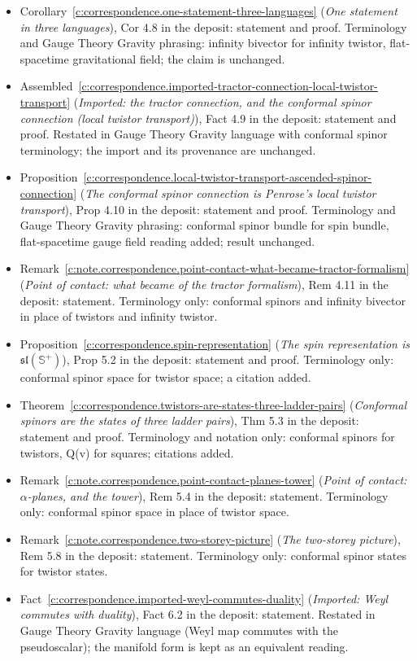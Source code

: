 \documentclass[11pt]{article}
\theoremstyle{definition}
\theoremstyle{plain}
\providecommand{\CS}{}\renewcommand{\CS}{{\mathbb{S}^{+}}}
\begin{document}
\begin{itemize}
\item Corollary~\ref{c:correspondence.one-statement-three-languages} (\emph{One statement in three languages}), Cor 4.8 in the deposit: statement and proof. Terminology and Gauge Theory Gravity phrasing: infinity bivector for infinity twistor, flat-spacetime gravitational field; the claim is unchanged.
\item Assembled~\ref{c:correspondence.imported-tractor-connection-local-twistor-transport} (\emph{Imported: the tractor connection, and the conformal spinor connection (local twistor transport)}), Fact 4.9 in the deposit: statement and proof. Restated in Gauge Theory Gravity language with conformal spinor terminology; the import and its provenance are unchanged.
\item Proposition~\ref{c:correspondence.local-twistor-transport-ascended-spinor-connection} (\emph{The conformal spinor connection is Penrose's local twistor transport}), Prop 4.10 in the deposit: statement and proof. Terminology and Gauge Theory Gravity phrasing: conformal spinor bundle for spin bundle, flat-spacetime gauge field reading added; result unchanged.
\item Remark~\ref{c:note.correspondence.point-contact-what-became-tractor-formalism} (\emph{Point of contact: what became of the tractor formalism}), Rem 4.11 in the deposit: statement. Terminology only: conformal spinors and infinity bivector in place of twistors and infinity twistor.
\item Proposition~\ref{c:correspondence.spin-representation} (\emph{The spin representation is $\mathfrak{sl}(\CS)$}), Prop 5.2 in the deposit: statement and proof. Terminology only: conformal spinor space for twistor space; a citation added.
\item Theorem~\ref{c:correspondence.twistors-are-states-three-ladder-pairs} (\emph{Conformal spinors are the states of three ladder pairs}), Thm 5.3 in the deposit: statement and proof. Terminology and notation only: conformal spinors for twistors, Q(v) for squares; citations added.
\item Remark~\ref{c:note.correspondence.point-contact-planes-tower} (\emph{Point of contact: $\alpha$-planes, and the tower}), Rem 5.4 in the deposit: statement. Terminology only: conformal spinor space in place of twistor space.
\item Remark~\ref{c:note.correspondence.two-storey-picture} (\emph{The two-storey picture}), Rem 5.8 in the deposit: statement. Terminology only: conformal spinor states for twistor states.
\item Fact~\ref{c:correspondence.imported-weyl-commutes-duality} (\emph{Imported: Weyl commutes with duality}), Fact 6.2 in the deposit: statement. Restated in Gauge Theory Gravity language (Weyl map commutes with the pseudoscalar); the manifold form is kept as an equivalent reading.

\end{itemize}
\end{document}
